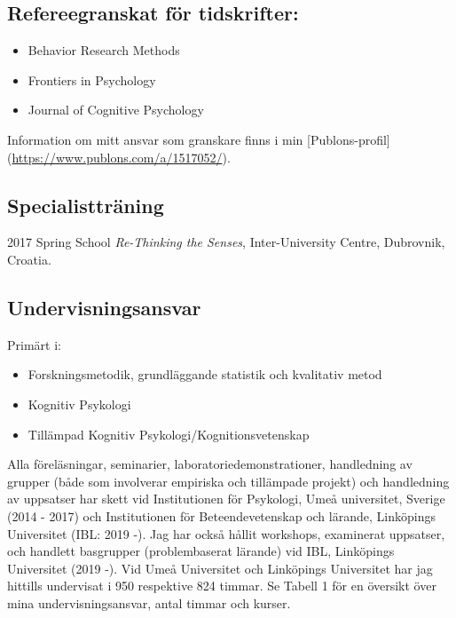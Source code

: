 \documentclass[]{article}
\providecommand{\tightlist}{%
  \setlength{\itemsep}{0pt}\setlength{\parskip}{0pt}}
\begin{document}
\hypertarget{refereegranskat-fuxf6r-tidskrifter}{%
\subsection{Refereegranskat för
tidskrifter:}\label{refereegranskat-fuxf6r-tidskrifter}}

\begin{itemize}
\item
  Behavior Research Methods
\item
  Frontiers in Psychology
\item
  Journal of Cognitive Psychology
\end{itemize}

Information om mitt ansvar som granskare finns i min
{[}Publons-profil{]} (\url{https://www.publons.com/a/1517052/}).

\hypertarget{specialisttruxe4ning}{%
\subsection{Specialistträning}\label{specialisttruxe4ning}}

2017 Spring School \emph{Re-Thinking the Senses}, Inter-University
Centre, Dubrovnik, Croatia.

\hypertarget{undervisningsansvar}{%
\subsection{Undervisningsansvar}\label{undervisningsansvar}}

Primärt i:

\begin{itemize}
\tightlist
\item
  Forskningsmetodik, grundläggande statistik och kvalitativ metod
\item
  Kognitiv Psykologi
\item
  Tillämpad Kognitiv Psykologi/Kognitionsvetenskap
\end{itemize}

Alla föreläsningar, seminarier, laboratoriedemonstrationer, handledning
av grupper (både som involverar empiriska och tillämpade projekt) och
handledning av uppsatser har skett vid Institutionen för Psykologi, Umeå
universitet, Sverige (2014 - 2017) och Institutionen för
Beteendevetenskap och lärande, Linköpings Universitet (IBL: 2019 -). Jag
har också hållit workshops, examinerat uppsatser, och handlett
basgrupper (problembaserat lärande) vid IBL, Linköpings Universitet
(2019 -). Vid Umeå Universitet och Linköpings Universitet har jag
hittills undervisat i 950 respektive 824 timmar. Se Tabell 1 för en
översikt över mina undervisningsansvar, antal timmar och kurser.
\end{document}
